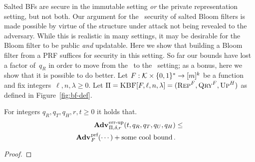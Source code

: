 Salted BFs are secure in the immutable setting \emph{or} the private
representation setting, but not both. Our argument for the \erreps\ security of
salted Bloom filters is made possible by virtue of the structure under attack
not being revealed to the adversary. While this is realistic in many settings,
it may be desirable for the Bloom filter to be public \emph{and} updatable.
%
Here we show that building a Bloom filter from a PRF suffices for security in
this setting.
%
So far our bounds have lost a factor of~$q_R$ in order to move from the \
to the \errep\ setting; as a bonus, here we show that it is possible to do
better.
%
Let $F:\mathcal{K}\times\{0,1\}^*\to[m]^k$ be a function and fix
integers~$\ell,n,\lambda\geq0$.
%
Let $\Pi = \textnormal{\textsc{KBF}}[F,\ell,n,\lambda] = (\textnormal{\textsc{Rep}}^F, \textnormal{\textsc{Qry}}^F, \textnormal{\textsc{Up}}^H)$ as defined in
Figure~\ref{fig:bf-def}.

\begin{theorem}\label{thm:bf-key-bound}
  For integers $q_R, q_T, q_H, r, t \geq 0$ it holds that.
  \begin{equation*}
    \begin{aligned}
      \Adv{\errep}_{\Pi,\delta,r}(t, q_R,q_T,q_U,q_H) &\leq \\
        \Adv{\prf}_{F}(\cdots) + \text{some cool bound} \,.
    \end{aligned}
  \end{equation*}
\end{theorem}
\begin{proof}
  
\end{proof}



